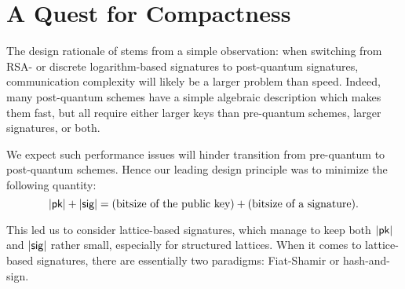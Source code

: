 
\section{A Quest for Compactness}

The design rationale of \falcon stems from a simple observation: when switching from RSA- or discrete logarithm-based signatures to post-quantum signatures, communication complexity will likely be a larger problem than speed. Indeed, many post-quantum schemes have a simple algebraic description which makes them fast, but all require either larger keys than pre-quantum schemes, larger signatures, or both.

\medskip

We expect such performance issues will hinder transition from pre-quantum to post-quantum schemes. Hence our leading design principle was to minimize the following quantity:
 $$|\textsf{pk}|+|\textsf{sig}| = \text{(bitsize of the public key)} + \text{(bitsize of a signature)}.$$

\medskip

This led us to consider lattice-based signatures, which manage to keep both $|\textsf{pk}|$ and $|\textsf{sig}|$ rather small, especially for structured lattices. When it comes to lattice-based signatures, there are essentially two paradigms: Fiat-Shamir or hash-and-sign.

